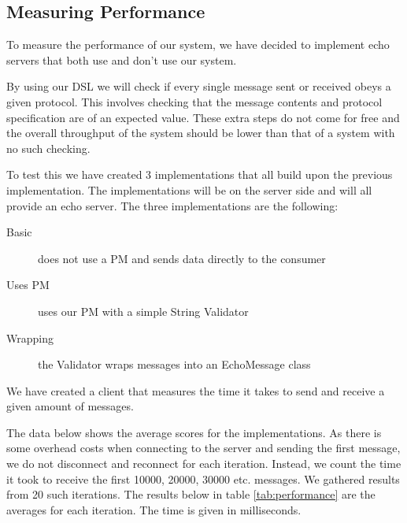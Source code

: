 \subsection{Measuring Performance}
To measure the performance of our system, we have decided to implement echo servers that both use and don't use our system.

By using our DSL we will check if every single message sent or received obeys a given protocol. This involves checking that the message contents and protocol specification are of an expected value. These extra steps do not come for free and the overall throughput of the system should be lower than that of a system with no such checking. 

To test this we have created 3 implementations that all build upon the previous implementation. The implementations will be on the server side and will all provide an echo server. The three implementations are the following:

\begin{description}
  \item[Basic] does not use a PM and sends data directly to the consumer
  \item[Uses PM] uses our PM with a simple String Validator
  \item[Wrapping] the Validator wraps messages into an EchoMessage class
\end{description}
We have created a client that measures the time it takes to send and receive a given amount of messages.

The data below shows the average scores for the implementations. As there is some overhead costs when connecting to the server and sending the first message, we do not disconnect and reconnect for each iteration. Instead, we count the time it took to receive the first 10000, 20000, 30000 etc. messages. We gathered results from 20 such iterations. The results below in table \ref{tab:performance} are the averages for each iteration. The time is given in milliseconds. 

